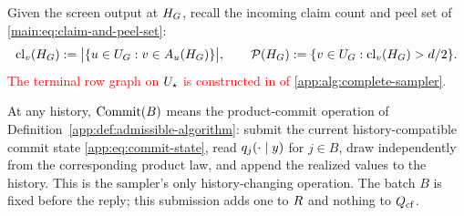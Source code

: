 \begin{algorithm}[p]
\end{algorithm}

Given the screen output at $H_{G}$, recall the incoming claim count and
peel set of \textcolor{red}{\cref{main:eq:claim-and-peel-set}}:
\begin{equation}
 \operatorname{cl}_{v}(H_{G})
 :=\bigl|\{u\in U_{G}:v\in A_{u}(H_{G})\}\bigr|,
 \qquad
 \mathcal P(H_{G}):=\{v\in U_{G}:
             \operatorname{cl}_{v}(H_{G})>d/2\}.
 \label{app:eq:claim-and-peel-set}
\end{equation}
\textcolor{red}{The terminal row graph on $U_{\star}$ is constructed in
 of \cref{app:alg:complete-sampler}.}

At any history, $\CommitOperation(B)$ means the product-commit operation
of Definition~\ref{app:def:admissible-algorithm}: submit the current
history-compatible commit state \ref{app:eq:commit-state}, read
$$ for $j\in B$, draw independently from the corresponding
product law, and append the realized values to the history.  This is the
sampler's only history-changing operation. The batch $B$ is fixed before
the reply; this submission adds one to $\CommitRounds$ and nothing to
$\CounterfactualQueries$.

